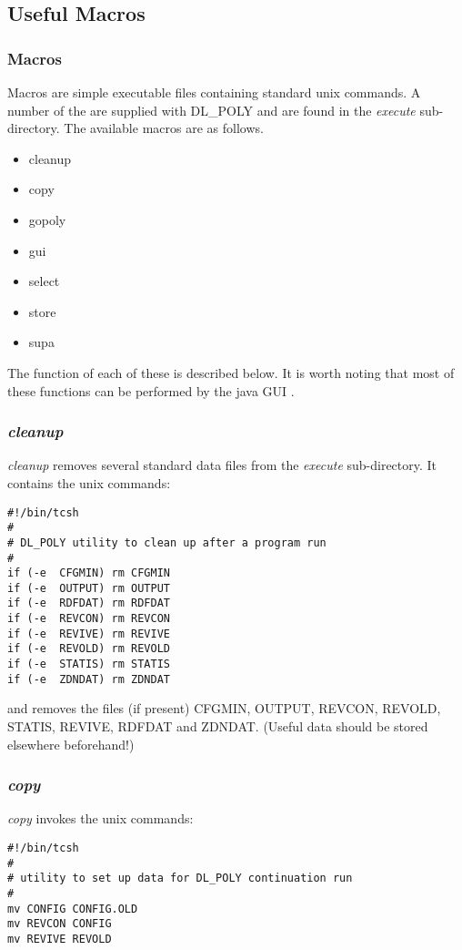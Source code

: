 
\subsection{Useful Macros}
\label{macros}
\subsubsection{Macros}
Macros are simple executable files containing standard unix commands.
A number of the are supplied with DL\_POLY and are found in the
{\em execute} sub-directory. The available macros are as follows.
{\sl
\begin{itemize}
\item cleanup
\item copy
\item gopoly
\item gui
\item select
\item store
\item supa
\end{itemize}
}

The function of each of these is described below. It is worth noting
that most of these functions can be performed by the \D{}
java GUI \cite{smith-gui}.

\subsubsection{{\sl cleanup}}

{\sl cleanup} removes several standard data files from the {\em
execute} sub-directory. It contains the unix commands:
\begin{verbatim}
#!/bin/tcsh
#
# DL_POLY utility to clean up after a program run
#
if (-e  CFGMIN) rm CFGMIN
if (-e  OUTPUT) rm OUTPUT
if (-e  RDFDAT) rm RDFDAT
if (-e  REVCON) rm REVCON
if (-e  REVIVE) rm REVIVE
if (-e  REVOLD) rm REVOLD
if (-e  STATIS) rm STATIS
if (-e  ZDNDAT) rm ZDNDAT
\end{verbatim}
\noindent and removes the files (if present) CFGMIN, OUTPUT, REVCON, 
REVOLD, STATIS, REVIVE, RDFDAT and ZDNDAT. (Useful data should
be stored elsewhere beforehand!)

\subsubsection{{\sl copy}}

{\sl copy} invokes the unix commands:

\begin{verbatim}
#!/bin/tcsh
#
# utility to set up data for DL_POLY continuation run
#
mv CONFIG CONFIG.OLD
mv REVCON CONFIG
mv REVIVE REVOLD
\end{verbatim}

